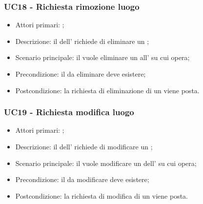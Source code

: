 \documentclass[../analisi-dei-requisiti]{subfiles}
\begin{document}
\subsubsection{UC18 - Richiesta rimozione luogo}
\label{subsub:UC18}

\begin{itemize}
\item Attori primari: ;
\item Descrizione: il  dell' richiede di eliminare un ;
\item Scenario principale: il  vuole eliminare un  all' su cui opera;
\item Precondizione: il  da eliminare deve esistere;
\item Postcondizione: la richiesta di eliminazione di un  viene posta.

\end{itemize}

\subsubsection{UC19 - Richiesta modifica luogo}
\label{subsub:UC19}

\begin{itemize}
\item Attori primari: ;
\item Descrizione: il  dell' richiede di modificare un ;
\item Scenario principale: il  vuole modificare un  dell' su cui opera;
\item Precondizione: il  da modificare deve esistere;
\item Postcondizione: la richiesta di modifica di un  viene posta.

\end{itemize}
\end{document}
